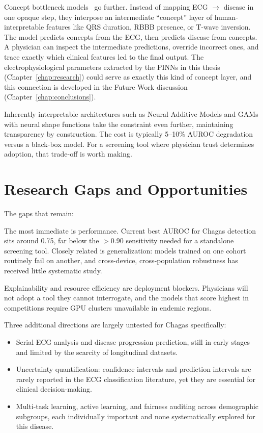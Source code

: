 Concept bottleneck models~\cite{koh2020concept} go further. Instead of mapping ECG $\to$ disease in one opaque step, they interpose an intermediate ``concept'' layer of human-interpretable features like QRS duration, RBBB presence, or T-wave inversion. The model predicts concepts from the ECG, then predicts disease from concepts. A physician can inspect the intermediate predictions, override incorrect ones, and trace exactly which clinical features led to the final output. The electrophysiological parameters extracted by the PINNs in this thesis (Chapter~\ref{chap:research}) could serve as exactly this kind of concept layer, and this connection is developed in the Future Work discussion (Chapter~\ref{chap:conclusions}).

Inherently interpretable architectures such as Neural Additive Models and GAMs with neural shape functions take the constraint even further, maintaining transparency by construction. The cost is typically 5--10\% AUROC degradation versus a black-box model. For a screening tool where physician trust determines adoption, that trade-off is worth making.

\section{Research Gaps and Opportunities}

The gaps that remain:

The most immediate is performance. Current best AUROC for Chagas detection sits around 0.75, far below the $>$0.90 sensitivity needed for a standalone screening tool. Closely related is generalization: models trained on one cohort routinely fail on another, and cross-device, cross-population robustness has received little systematic study.

Explainability and resource efficiency are deployment blockers. Physicians will not adopt a tool they cannot interrogate, and the models that score highest in competitions require GPU clusters unavailable in endemic regions.

Three additional directions are largely untested for Chagas specifically:
\begin{itemize}
    \item Serial ECG analysis and disease progression prediction, still in early stages and limited by the scarcity of longitudinal datasets.
    \item Uncertainty quantification: confidence intervals and prediction intervals are rarely reported in the ECG classification literature, yet they are essential for clinical decision-making.
    \item Multi-task learning, active learning, and fairness auditing across demographic subgroups, each individually important and none systematically explored for this disease.
\end{itemize}